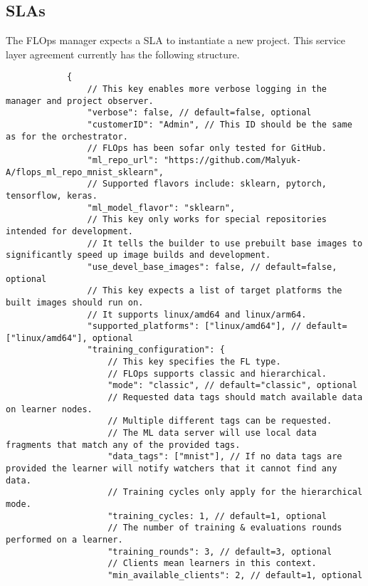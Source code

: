     \subsection{SLAs}
        The FLOps manager expects a SLA to instantiate a new project.
        This service layer agreement currently has the following structure.

        \begin{lstlisting}
            {
                // This key enables more verbose logging in the manager and project observer.
                "verbose": false, // default=false, optional
                "customerID": "Admin", // This ID should be the same as for the orchestrator.
                // FLOps has been sofar only tested for GitHub.
                "ml_repo_url": "https://github.com/Malyuk-A/flops_ml_repo_mnist_sklearn",
                // Supported flavors include: sklearn, pytorch, tensorflow, keras.
                "ml_model_flavor": "sklearn",
                // This key only works for special repositories intended for development.
                // It tells the builder to use prebuilt base images to significantly speed up image builds and development.
                "use_devel_base_images": false, // default=false, optional
                // This key expects a list of target platforms the built images should run on.
                // It supports linux/amd64 and linux/arm64.
                "supported_platforms": ["linux/amd64"], // default=["linux/amd64"], optional
                "training_configuration": {
                    // This key specifies the FL type.
                    // FLOps supports classic and hierarchical.
                    "mode": "classic", // default="classic", optional
                    // Requested data tags should match available data on learner nodes.
                    // Multiple different tags can be requested.
                    // The ML data server will use local data fragments that match any of the provided tags.
                    "data_tags": ["mnist"], // If no data tags are provided the learner will notify watchers that it cannot find any data.
                    // Training cycles only apply for the hierarchical mode.
                    "training_cycles: 1, // default=1, optional
                    // The number of training & evaluations rounds performed on a learner.
                    "training_rounds": 3, // default=3, optional
                    // Clients mean learners in this context.
                    "min_available_clients": 2, // default=1, optional

\end{lstlisting}
